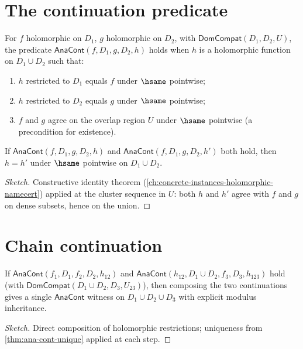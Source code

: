 \section{The continuation predicate}

\begin{definition}
\label{def:ana-cont}
For \(f\) holomorphic on \(D_1\), \(g\) holomorphic on \(D_2\), with \(\mathsf{DomCompat}(D_1, D_2, U)\), the predicate \(\mathsf{AnaCont}(f, D_1, g, D_2, h)\) holds when \(h\) is a holomorphic function on \(D_1 \cup D_2\) such that:
\begin{enumerate}
  \item \(h\) restricted to \(D_1\) equals \(f\) under \(\hsame\) pointwise;
  \item \(h\) restricted to \(D_2\) equals \(g\) under \(\hsame\) pointwise;
  \item \(f\) and \(g\) agree on the overlap region \(U\) under \(\hsame\) pointwise (a precondition for existence).
\end{enumerate}
\end{definition}

\begin{theorem}
\label{thm:ana-cont-unique}
If \(\mathsf{AnaCont}(f, D_1, g, D_2, h)\) and \(\mathsf{AnaCont}(f, D_1, g, D_2, h')\) both hold, then \(h = h'\) under \(\hsame\) pointwise on \(D_1 \cup D_2\).
\end{theorem}
\begin{proof}[Sketch]
Constructive identity theorem (\autoref{ch:concrete-instances-holomorphic-namecert}) applied at the cluster sequence in \(U\): both \(h\) and \(h'\) agree with \(f\) and \(g\) on dense subsets, hence on the union.
\end{proof}

\section{Chain continuation}

\begin{theorem}
\label{thm:chain-continuation}
If \(\mathsf{AnaCont}(f_1, D_1, f_2, D_2, h_{12})\) and \(\mathsf{AnaCont}(h_{12}, D_1 \cup D_2, f_3, D_3, h_{123})\) hold (with \(\mathsf{DomCompat}(D_1 \cup D_2, D_3, U_{23})\)), then composing the two continuations gives a single \(\mathsf{AnaCont}\) witness on \(D_1 \cup D_2 \cup D_3\) with explicit modulus inheritance.
\end{theorem}
\begin{proof}[Sketch]
Direct composition of holomorphic restrictions; uniqueness from \autoref{thm:ana-cont-unique} applied at each step.
\end{proof}

